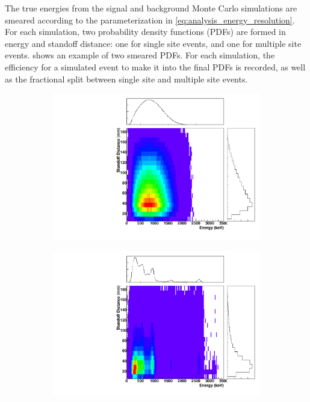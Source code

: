 \documentclass[herrin-thesis.tex]{subfiles}
\begin{document}
The true energies from the signal and background Monte Carlo simulations are smeared according to the parameterization in \cref{eq:analysis_energy_resolution}. For each simulation, two probability density functions (PDFs) are formed in energy and standoff distance: one for single site events, and one for multiple site events.  shows an example of two smeared PDFs. For each simulation, the efficiency for a simulated event to make it into the final PDFs is recorded, as well as the fractional split between single site and multiple site events.

\begin{figure}[htbp]
\centering
	\begin{subfigure}[b]{0.48\textwidth}
	\centering
	\includegraphics[width=\textwidth]{./plots/PDFs/analysis_pdf_bb2n_ss.pdf}
	\end{subfigure}\hfill%
	\begin{subfigure}[b]{0.48\textwidth}
	\centering
	\includegraphics[width=\textwidth]{./plots/PDFs/analysis_pdf_AllVessel_Th232_ss.pdf}

\end{subfigure}
\end{figure}
\end{document}
